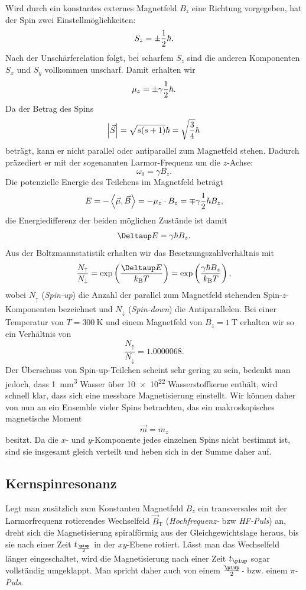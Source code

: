\documentclass[
    11pt,
    ngerman
]{scrreprt}
\begin{document}
Wird durch ein konstantes externes Magnetfeld $B_z$ eine Richtung vorgegeben,
hat der Spin zwei Einstellmöglichkeiten:
\[
    S_z = \pm\frac 12\hbar.
\]
Nach der Unschärferelation folgt, bei scharfem $S_z$ sind die anderen
Komponenten $S_x$ und $S_y$ vollkommen unscharf. Damit erhalten wir
\[
    \mu_z = \pm\gamma\frac 12\hbar.
\]
Da der Betrag des Spins 
\[
    \abs{\vec S} = \sqrt{s(s+1)}\hbar = \sqrt{\frac34}\hbar
\]
beträgt, kann er nicht parallel oder antiparallel zum Magnetfeld stehen.
Dadurch präzediert er mit der sogenannten Larmor-Frequenz um die $z$-Achse:
\[
    \omega_0 = \gamma B_z.
\]
Die potenzielle Energie des Teilchens im Magnetfeld beträgt
\[
    E = -\left\langle\vec\mu,\vec B\right\rangle = -\mu_z \cdot B_z = \mp\gamma\frac 12\hbar B_z,
\]
die Energiedifferenz der beiden möglichen Zustände ist damit
\[
    \Deltaup E = \gamma\hbar B_z.
\]
Aus der Boltzmannstatistik erhalten wir das Besetzungszahlverhältnis mit
\[
    \frac{N_\uparrow}{N_\downarrow} = \dexp{\frac{\Deltaup E}{k_\text{B}T}} =
    \dexp{\frac{\gamma\hbar B_z}{k_\text{B}T}},
\]
wobei $N_\uparrow$ (\emph{Spin-up}) die Anzahl der parallel zum Magnetfeld
stehenden Spin-$z$-Komponenten bezeichnet und $N_\downarrow$ (\emph{Spin-down})
die Antiparallelen. Bei einer Temperatur von $T = \SI{300}{\kelvin}$ und einem
Magnetfeld von $B_z = \SI{1}{\tesla}$ erhalten wir so ein Verhältnis von
\[
    \frac{N_\uparrow}{N_\downarrow} = \num{1.0000068}.
\]
Der Überschuss von Spin-up-Teilchen scheint sehr gering zu sein, bedenkt man
jedoch, dass \SI{1}{\milli\meter\cubed} Wasser über \num{10e22} Wasserstoffkerne
enthält, wird schnell klar, dass sich eine messbare Magnetisierung einstellt.
Wir können daher von nun an ein Ensemble vieler Spins betrachten, das ein
makroskopisches magnetische Moment
\[
    \vec m = m_z
\]
besitzt. Da die $x$- und $y$-Komponente jedes einzelnen Spins nicht bestimmt ist, sind sie insgesamt gleich verteilt und heben sich in der Summe daher auf.

\subsection{Kernspinresonanz}

Legt man zusätzlich zum Konstanten Magnetfeld $B_z$ ein transversales mit der
Larmorfrequenz rotierendes Wechselfeld $\vec B_\text{T}$ (\emph{Hochfrequenz-}
bzw \emph{HF-Puls}) an, dreht sich die Magnetisierung spiralförmig aus der
Gleichgewichtslage heraus, bis sie nach einer Zeit $t_{\frac\piup2}$ in der
$xy$-Ebene rotiert. Lässt man das Wechselfeld länger eingeschaltet, wird die
Magnetisierung nach einer Zeit $t_{\piup}$ sogar vollständig umgeklappt. Man
spricht daher auch von einem \emph{$\frac\piup2$-} bzw. einem
\emph{$\pi$-Puls}.
\end{document}
